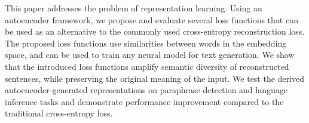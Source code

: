 This paper addresses the problem of representation learning. Using an autoencoder framework, we propose and evaluate several loss functions that can be used as an alternative to the commonly used cross-entropy reconstruction loss. The proposed loss functions use similarities between words in the embedding space, and can be used to train any neural model for text generation. We show that the introduced loss functions amplify semantic diversity of reconstructed sentences, while preserving the original meaning of the input. We test the derived autoencoder-generated representations on paraphrase detection and language inference tasks and demonstrate performance improvement compared to the traditional cross-entropy loss.
